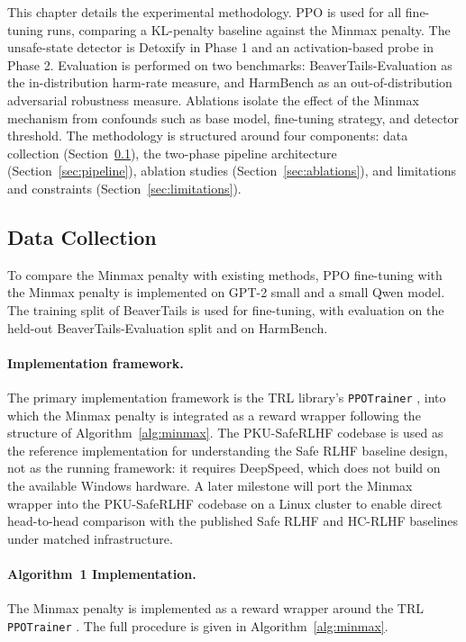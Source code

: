 \documentclass[a4paper,twoside,12pt]{report}
\begin{document}
This chapter details the experimental methodology. PPO is used for all fine-tuning runs,
comparing a KL-penalty baseline against the Minmax penalty. The unsafe-state detector is
Detoxify in Phase 1 and an activation-based probe in Phase 2. Evaluation is performed on
two benchmarks: BeaverTails-Evaluation \citep{ji2023beavertails} as the in-distribution
harm-rate measure, and HarmBench \citep{mazeika2024} as an out-of-distribution adversarial
robustness measure. Ablations isolate the effect of the Minmax mechanism from confounds
such as base model, fine-tuning strategy, and detector threshold. The methodology is structured around four components: data collection (Section~\ref{sec:data-collection}),
the two-phase pipeline architecture (Section~\ref{sec:pipeline}), ablation studies
(Section~\ref{sec:ablations}), and limitations and constraints
(Section~\ref{sec:limitations}).

\subsection{Data Collection}
\label{sec:data-collection}

To compare the Minmax penalty with existing methods, PPO fine-tuning with the Minmax
penalty is implemented on GPT-2 small and a small Qwen model. The training split of
BeaverTails is used for fine-tuning, with evaluation on the held-out BeaverTails-Evaluation
split and on HarmBench.

\paragraph{Implementation framework.}
The primary implementation framework is the TRL library's \texttt{PPOTrainer}
\citep{vonwerra2022trl}, into which the Minmax penalty is integrated as a reward
wrapper following the structure of Algorithm~\ref{alg:minmax}. The PKU-SafeRLHF
codebase \citep{ji2024pkusaferlhf} is used as the reference implementation for
understanding the Safe RLHF baseline design, not as the running framework: it
requires DeepSpeed, which does not build on the available Windows hardware. A
later milestone will port the Minmax wrapper into the PKU-SafeRLHF codebase on a
Linux cluster to enable direct head-to-head comparison with the published Safe RLHF
and HC-RLHF baselines under matched infrastructure.

\paragraph{Algorithm~1 Implementation.}
The Minmax penalty is implemented as a reward wrapper around the TRL
\texttt{PPOTrainer} \citep{vonwerra2022trl}. The full procedure is given in
Algorithm~\ref{alg:minmax}.
\end{document}
